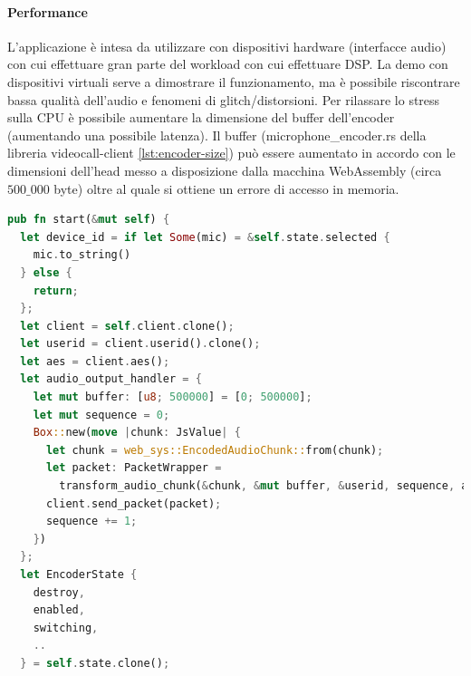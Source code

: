 \documentclass{article}
\begin{document}
\paragraph{Performance}L'applicazione è intesa da utilizzare con dispositivi hardware (interfacce audio)
con cui effettuare gran parte del workload con cui effettuare DSP. La demo con dispositivi virtuali serve
a dimostrare il funzionamento, ma è possibile riscontrare bassa qualità dell'audio e fenomeni di glitch/distorsioni.
Per rilassare lo stress sulla CPU è possibile aumentare la dimensione del buffer dell'encoder (aumentando una 
possibile latenza). Il buffer (microphone\_encoder.rs della libreria videocall-client \cref{lst:encoder-size}) può essere aumentato
in accordo con le dimensioni dell'head messo a disposizione dalla macchina WebAssembly (circa $500\_000$ byte)
oltre al quale si ottiene un errore di accesso in memoria.

\begin{lstlisting}[language=Rust, style=boxed, label={lst:encoder-size}, captionpos=b,caption={Dimensione del buffer per l'encoder OPUS}]
pub fn start(&mut self) {
  let device_id = if let Some(mic) = &self.state.selected {
    mic.to_string()
  } else {
    return;
  };
  let client = self.client.clone();
  let userid = client.userid().clone();
  let aes = client.aes();
  let audio_output_handler = {
    let mut buffer: [u8; 500000] = [0; 500000];
    let mut sequence = 0;
    Box::new(move |chunk: JsValue| {
      let chunk = web_sys::EncodedAudioChunk::from(chunk);
      let packet: PacketWrapper =
        transform_audio_chunk(&chunk, &mut buffer, &userid, sequence, aes.clone());
      client.send_packet(packet);
      sequence += 1;
    })
  };
  let EncoderState {
    destroy,
    enabled,
    switching,
    ..
  } = self.state.clone();
\end{lstlisting}
\clearpage




\end{document}
